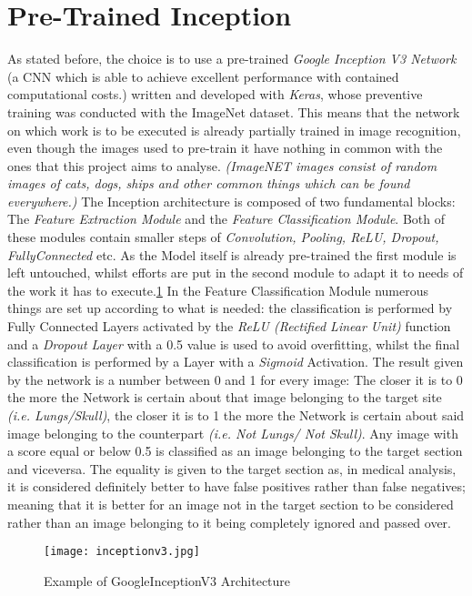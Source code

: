 \documentclass[../main.tex]{subfiles}
\begin{document}
\section{Pre-Trained Inception}
As stated before, the choice is to use a pre-trained \textit{Google Inception V3 Network} (a CNN which is able to achieve excellent performance with contained computational costs.\cite{Szegedy2015a}) written and developed with \textit{Keras}, whose preventive training was conducted with the ImageNet dataset.\cite{kerasinception} This means that the network on which work is to be executed is already partially trained in image recognition, even though the images used to pre-train it have nothing in common with the ones that this project aims to analyse. \textit{(ImageNET images consist of random images of cats, dogs, ships and other common things which can be found everywhere.)}
The Inception architecture is composed of two fundamental blocks: The \textit{Feature Extraction Module} and the \textit{Feature Classification Module}. Both of these modules contain smaller steps of \textit{Convolution, Pooling, ReLU, Dropout, FullyConnected} etc. As the Model itself is already pre-trained the first module is left untouched, whilst efforts are put in the second module to adapt it to needs of the work it has to execute.\ref{fig:inceptionv3} In the Feature Classification Module numerous things are set up according to what is needed: the classification is performed by Fully Connected Layers activated by the \textit{ReLU (Rectified Linear Unit)} function and a \textit{Dropout Layer} with a 0.5 value is used to avoid overfitting, whilst the final classification is performed by a Layer with a \textit{Sigmoid} Activation. The result given by the network is a number between 0 and 1 for every image: The closer it is to 0 the more the Network is certain about that image belonging to the target site \textit{(i.e. Lungs/Skull)}, the closer it is to 1 the more the Network is certain about said image belonging to the counterpart \textit{(i.e. Not Lungs/ Not Skull)}. Any image with a score equal or below 0.5 is classified as an image belonging to the target section and viceversa. The equality is given to the target section as, in medical analysis, it is considered definitely better to have false positives rather than false negatives; meaning that it is better for an image not in the target section to be considered rather than an image belonging to it being completely ignored and passed over. 
\begin{figure}[h!bt]
\centering
\texttt{[image: inceptionv3.jpg]}
\caption{Example of GoogleInceptionV3 Architecture}
\label{fig:inceptionv3}
\end{figure}
\end{document}
